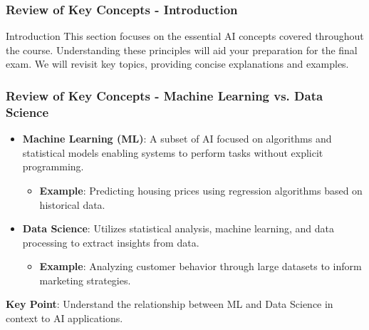 \documentclass[aspectratio=169]{beamer}
\begin{document}
\begin{frame}[fragile]
    \frametitle{Review of Key Concepts - Introduction}
    \begin{block}{Introduction}
        This section focuses on the essential AI concepts covered throughout the course. 
        Understanding these principles will aid your preparation for the final exam. 
        We will revisit key topics, providing concise explanations and examples. 
    \end{block}
\end{frame}

\begin{frame}[fragile]
    \frametitle{Review of Key Concepts - Machine Learning vs. Data Science}
    \begin{itemize}
        \item \textbf{Machine Learning (ML)}: A subset of AI focused on algorithms and statistical models enabling systems to perform tasks without explicit programming.
            \begin{itemize}
                \item \textbf{Example}: Predicting housing prices using regression algorithms based on historical data.
            \end{itemize}
            
        \item \textbf{Data Science}: Utilizes statistical analysis, machine learning, and data processing to extract insights from data.
            \begin{itemize}
                \item \textbf{Example}: Analyzing customer behavior through large datasets to inform marketing strategies.
            \end{itemize}
    \end{itemize}
    \textbf{Key Point}: Understand the relationship between ML and Data Science in context to AI applications.
\end{frame}
\end{document}
